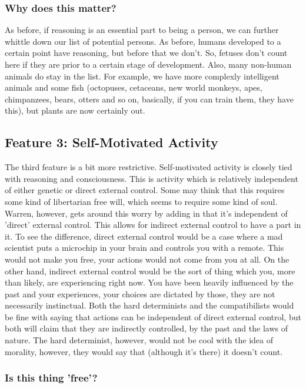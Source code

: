 \subsubsection{Why does this matter?}

As before, if reasoning is an essential part to being a person, we can further whittle down our list of potential persons. As before, humans developed to a certain point have reasoning, but before that we don't. So, fetuses don't count here if they are prior to a certain stage of development. Also, many non-human animals do stay in the list. For example, we have more complexly intelligent animals and some fish (octopuses, cetaceans, new world monkeys, apes, chimpanzees, bears, otters and so on, basically, if you can train them, they have this), but plants are now certainly out. 

\subsection{Feature 3: Self-Motivated Activity}

The third feature is a bit more restrictive. Self-motivated activity is closely tied with reasoning and consciousness. This is activity which is relatively independent of either genetic or direct external control. Some may think that this requires some kind of libertarian free will, which seems to require some kind of soul. Warren, however, gets around this worry by adding in that it's independent of 'direct' external control. This allows for indirect external control to have a part in it. To see the difference, direct external control would be a case where a mad scientist puts a microchip in your brain and controls you with a remote. This would not make you free, your actions would not come from you at all. On the other hand, indirect external control would be the sort of thing which you, more than likely, are experiencing right now. You have been heavily influenced by the past and your experiences, your choices are dictated by those, they are not necessarily instinctual. Both the hard determinists and the compatibilists would be fine with saying that actions can be independent of direct external control, but both will claim that they are indirectly controlled, by the past and the laws of nature. The hard determinist, however, would not be cool with the idea of morality, however, they would say that (although it's there) it doesn't count.

\subsubsection{Is this thing 'free'?}

